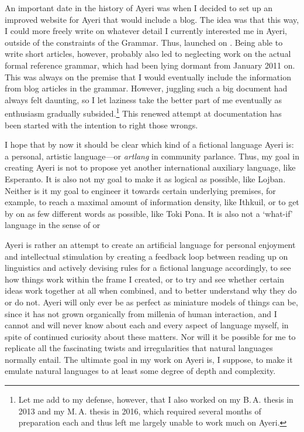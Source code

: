 An important date in the history of Ayeri was when I decided to set up an 
improved website for Ayeri that would include a blog. The idea was that this 
way, I could more freely write on whatever detail I currently interested me in 
Ayeri, outside of the constraints of the Grammar. Thus,  launched on . Being able to write short 
articles, however, probably also led to neglecting work on the actual formal 
reference grammar, which had been lying dormant from January 2011 on. This was 
always on the premise that I would eventually include the information from blog 
articles in the grammar. However, juggling such a big document had always felt 
daunting, so I let laziness take the better part of me eventually as enthusiasm 
gradually subsided.\footnote{Let me add to my defense, however, that I also 
worked on my B.\,A. thesis in 2013 and my M.\,A. thesis in 2016, which required 
several months of preparation each and thus left me largely unable to work much 
on Ayeri.} This renewed attempt at documentation has been started with the 
intention to right those wrongs.

I hope that by now it should be clear which kind of a fictional language Ayeri 
is: a personal, artistic language---or \emph{artlang} in community parlance.
Thus, my goal in creating Ayeri is not to propose yet another 
international auxiliary language, like Esperanto. It is also not my goal to make 
it as logical as possible, like Lojban. Neither is it my goal to engineer it 
towards certain underlying premises, for example, to reach a maximal amount of 
information density, like Ithkuil, or to get by on as few different words as 
possible, like Toki Pona. It is also not a `what-if' language in the sense of 
 or 

Ayeri is rather an attempt to create an artificial language for personal 
enjoyment and intellectual stimulation by creating a feedback loop between 
reading up on linguistics and actively devising rules for a fictional language 
accordingly, to see how things work within the frame I created, or to try and 
see whether certain ideas work together at all when combined, and to better
understand why they do or do not. Ayeri will only ever be as perfect as 
miniature models of things can be, since it has not grown organically from 
millenia of human interaction, and I cannot and will never know about each and 
every aspect of language myself, in spite of continued curiosity about these 
matters. Nor will it be possible for me to replicate all the fascinating twists 
and irregularities that natural languages normally entail. The ultimate 
goal in my work on Ayeri is, I suppose, to make it emulate natural 
languages to at least some degree of depth and complexity.

